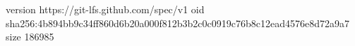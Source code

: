 version https://git-lfs.github.com/spec/v1
oid sha256:4b894bb9c34ff860d6b20a000f812b3b2c0c0919c76b8c12ead4576e8d72a9a7
size 186985

